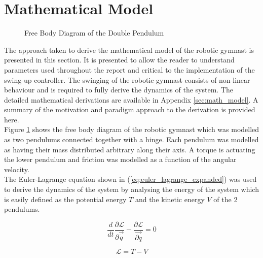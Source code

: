 \section{Mathematical Model}
\label{sec:mathematical_model}
\begin{figure}[h]
	\centering
	
	\caption{Free Body Diagram of the Double Pendulum}
	\label{fig:doublePen}
\end{figure}

The approach taken to derive the mathematical model of the robotic gymnast is presented in this section. It is presented to allow the reader to understand parameters used throughout the report and critical to the implementation of the swing-up controller. The swinging of the robotic gymnast consists of non-linear behaviour and is required to fully derive the dynamics of the system. The detailed mathematical derivations are available in Appendix \ref{sec:math_model}. A summary of the motivation and paradigm approach to the derivation is provided here.\\

 Figure \ref{fig:doublePen} shows the free body diagram of the robotic gymnast which was modelled as two pendulums connected together with a hinge. Each pendulum was modelled as having their mass distributed arbitrary along their axis. A torque is actuating the lower pendulum and friction was modelled as a function of the angular velocity.\\

The Euler-Lagrange equation shown in (\ref{eq:euler_lagrange_expanded}) was used to derive the dynamics of the system by analysing the energy of the system which is easily defined as the potential energy $T$ and the kinetic energy $V$ of the 2 pendulums.
 
\begin{equation} \label{eq:euler_lagrange_expanded}
\frac{d}{dt}\frac{\partial\mathcal{L}}{\partial\vec{\dot{q}}}-\frac{\partial\mathcal{L}}{ \vec{\partial q}} = 0
\end{equation}

\begin{equation} \label{eq:euler_lagrane}
\mathcal{L}=T-V
\end{equation}

